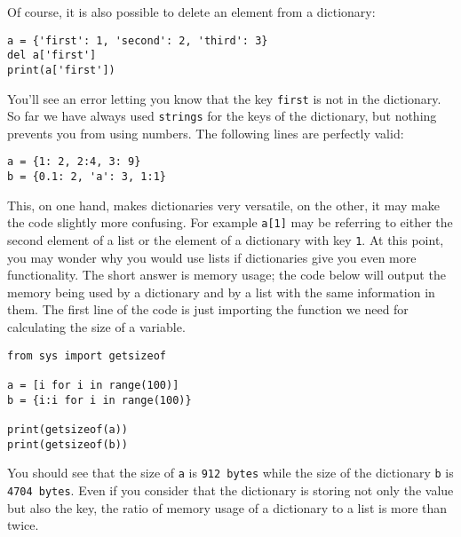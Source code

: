 
Of course, it is also possible to delete an element from a dictionary:

\begin{verbatim}
a = {'first': 1, 'second': 2, 'third': 3}
del a['first']
print(a['first'])
\end{verbatim}

You'll see an error letting you know that the key \texttt{first} is not
in the dictionary. So far we have always used \texttt{strings} for the
keys of the dictionary, but nothing prevents you from using numbers. The
following lines are perfectly valid:

\begin{verbatim}
a = {1: 2, 2:4, 3: 9}
b = {0.1: 2, 'a': 3, 1:1}
\end{verbatim}

This, on one hand, makes dictionaries very versatile, on the other, it
may make the code slightly more confusing. For example \texttt{a[1]}
may be referring to either the second element of a list or the element
of a dictionary with key \texttt{1}. At this point, you may wonder why
you would use lists if dictionaries give you even more functionality.
The short answer is memory usage; the code below will output the memory
being used by a dictionary and by a list with the same information in
them. The first line of the code is just importing the function we need
for calculating the size of a variable.

\begin{verbatim}
from sys import getsizeof

a = [i for i in range(100)]
b = {i:i for i in range(100)}

print(getsizeof(a))
print(getsizeof(b))
\end{verbatim}

You should see that the size of \texttt{a} is \texttt{912\ bytes} while
the size of the dictionary \texttt{b} is \texttt{4704\ bytes}. Even if
you consider that the dictionary is storing not only the value but also
the key, the ratio of memory usage of a dictionary to a list is more
than twice.

